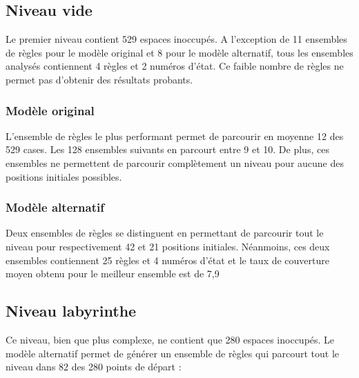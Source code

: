 \documentclass{article}
\begin{document}
\subsection{Niveau vide}

Le premier niveau contient 529 espaces inoccupés. A l’exception de 11
ensembles de règles pour le modèle original et 8 pour le modèle
alternatif, tous les ensembles analysés contiennent 4 règles et 2
numéros d’état. Ce faible nombre de règles ne permet pas d’obtenir des
résultats probants.

\subsubsection{Modèle original}

L’ensemble de règles le plus performant permet de parcourir en moyenne
12 des 529 cases. Les 128 ensembles suivants en parcourt entre 9 et
10. De plus, ces ensembles ne permettent de parcourir complètement un
niveau pour aucune des positions initiales possibles.

\subsubsection{Modèle alternatif}

Deux ensembles de règles se distinguent en permettant de parcourir
tout le niveau pour respectivement 42 et 21 positions
initiales. Néanmoins, ces deux ensembles contiennent 25 règles et 4
numéros d’état et le taux de couverture moyen obtenu pour le meilleur
ensemble est de 7,9%

\newpage
\subsection{Niveau labyrinthe}

Ce niveau, bien que plus complexe, ne contient que 280 espaces
inoccupés. Le modèle alternatif permet de générer un ensemble de
règles qui parcourt tout le niveau dans 82 des 280 points de départ :
\end{document}
